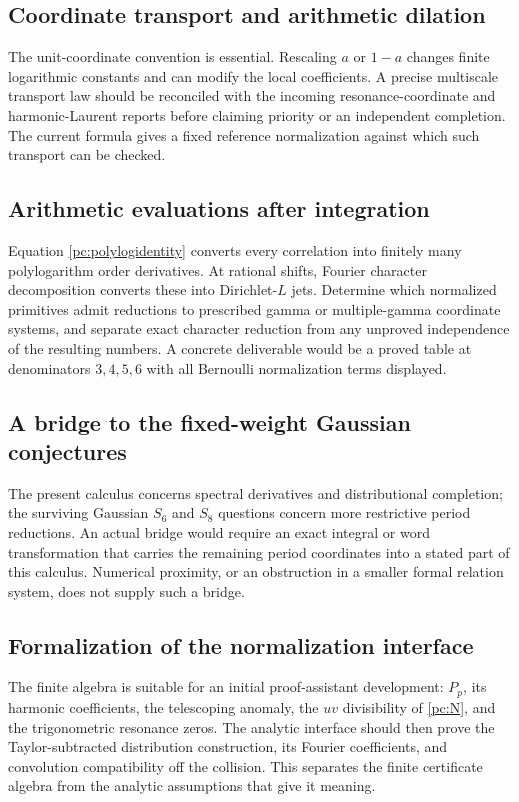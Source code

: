 \documentclass[11pt,a4paper]{article}
\numberwithin{equation}{section}
\theoremstyle{definition}
\begin{document}
\subsection{Coordinate transport and arithmetic dilation}
The unit-coordinate convention is essential. Rescaling $a$ or $1-a$ changes finite logarithmic constants and can modify the local coefficients. A precise multiscale transport law should be reconciled with the incoming resonance-coordinate and harmonic-Laurent reports before claiming priority or an independent completion. The current formula gives a fixed reference normalization against which such transport can be checked.

\subsection{Arithmetic evaluations after integration}
Equation \eqref{pc:polylogidentity} converts every correlation into finitely many polylogarithm order derivatives. At rational shifts, Fourier character decomposition converts these into Dirichlet-$L$ jets. Determine which normalized primitives admit reductions to prescribed gamma or multiple-gamma coordinate systems, and separate exact character reduction from any unproved independence of the resulting numbers. A concrete deliverable would be a proved table at denominators $3,4,5,6$ with all Bernoulli normalization terms displayed.

\subsection{A bridge to the fixed-weight Gaussian conjectures}
The present calculus concerns spectral derivatives and distributional completion; the surviving Gaussian $S_6$ and $S_8$ questions concern more restrictive period reductions. An actual bridge would require an exact integral or word transformation that carries the remaining period coordinates into a stated part of this calculus. Numerical proximity, or an obstruction in a smaller formal relation system, does not supply such a bridge.

\subsection{Formalization of the normalization interface}
The finite algebra is suitable for an initial proof-assistant development: $P_p$, its harmonic coefficients, the telescoping anomaly, the $uv$ divisibility of \eqref{pc:N}, and the trigonometric resonance zeros. The analytic interface should then prove the Taylor-subtracted distribution construction, its Fourier coefficients, and convolution compatibility off the collision. This separates the finite certificate algebra from the analytic assumptions that give it meaning.
\end{document}
